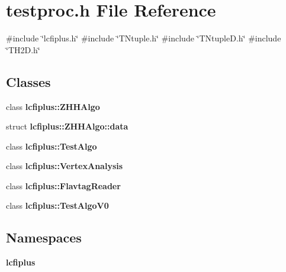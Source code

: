 \section{testproc.\+h File Reference}
\label{testproc_8h}
{\ttfamily \#include \char`\"{}lcfiplus.\+h\char`\"{}}\newline
{\ttfamily \#include \char`\"{}T\+Ntuple.\+h\char`\"{}}\newline
{\ttfamily \#include \char`\"{}T\+Ntuple\+D.\+h\char`\"{}}\newline
{\ttfamily \#include \char`\"{}T\+H2\+D.\+h\char`\"{}}\newline
\subsection*{Classes}
\begin{DoxyCompactItemize}
\item 
class \textbf{ lcfiplus\+::\+Z\+H\+H\+Algo}
\item 
struct \textbf{ lcfiplus\+::\+Z\+H\+H\+Algo\+::data}
\item 
class \textbf{ lcfiplus\+::\+Test\+Algo}
\item 
class \textbf{ lcfiplus\+::\+Vertex\+Analysis}
\item 
class \textbf{ lcfiplus\+::\+Flavtag\+Reader}
\item 
class \textbf{ lcfiplus\+::\+Test\+Algo\+V0}
\end{DoxyCompactItemize}
\subsection*{Namespaces}
\begin{DoxyCompactItemize}
\item 
 \textbf{ lcfiplus}
\end{DoxyCompactItemize}

